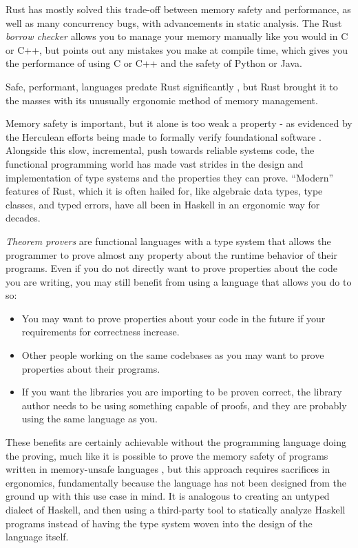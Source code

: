 \documentclass[12pt,twoside]{report}
\begin{document}
Rust \citep{RustProgrammingLanguage2015} has mostly solved this trade-off between memory safety and performance, as well as many concurrency bugs, with advancements in static analysis. The Rust \textit{borrow checker} allows you to manage your memory manually like you would in C or C++, but points out any mistakes you make at compile time, which gives you the performance of using C or C++ and the safety of Python or Java.

Safe, performant, languages predate Rust significantly \citep{morrisettCycloneSafeDialect}, but Rust brought it to the masses with its unusually ergonomic method of memory management. 

Memory safety is important, but it alone is too weak a property - as evidenced by the Herculean efforts being made to formally verify foundational software \citep{kleinSeL4FormalVerification2009a, lorch2020armada, ferraiuolo2017komodo, bhargavan2017everest}. Alongside this slow, incremental, push towards reliable systems code, the functional programming world has made vast strides in the design and implementation of type systems and the properties they can prove. ``Modern'' features of Rust, which it is often hailed for, like algebraic data types, type classes, and typed errors, have all been in Haskell in an ergonomic way for decades.

\textit{Theorem provers} are functional languages with a type system that allows the programmer to prove almost \citep{kurtgodelUberFormalUnentscheidbare1931} any property about the runtime behavior of their programs. Even if you do not directly want to prove properties about the code you are writing, you may still benefit from using a language that allows you do to so:
\begin{itemize}
  \itemsep0em 
  \item You may want to prove properties about your code in the future if your requirements for correctness increase.
  \item Other people working on the same codebases as you may want to prove properties about their programs.
  \item If you want the libraries you are importing to be proven correct, the library author needs to be using something capable of proofs, and they are probably using the same language as you.
\end{itemize}

These benefits are certainly achievable without the programming language doing the proving, much like it is possible to prove the memory safety of programs written in memory-unsafe languages \citep{kleinSeL4FormalVerification2009a}, but this approach requires sacrifices in ergonomics, fundamentally because the language has not been designed from the ground up with this use case in mind. It is analogous to creating an untyped dialect of Haskell, and then using a third-party tool to statically analyze Haskell programs instead of having the type system woven into the design of the language itself.
\end{document}
